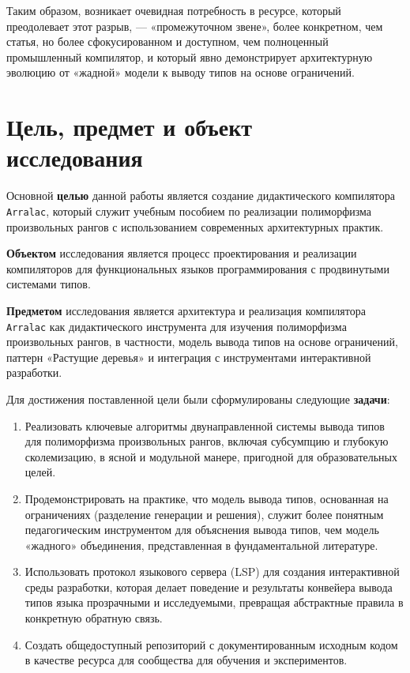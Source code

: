 Таким образом, возникает очевидная потребность в ресурсе, который преодолевает этот разрыв, — «промежуточном звене», более конкретном, чем статья, но более сфокусированном и доступном, чем полноценный промышленный компилятор, и который явно демонстрирует архитектурную эволюцию от «жадной» модели к выводу типов на основе ограничений.

\chapter{Цель, предмет и объект \\ исследования}
Основной \textbf{целью} данной работы является создание дидактического компилятора \texttt{Arralac}, который служит учебным пособием по реализации полиморфизма произвольных рангов с использованием современных архитектурных практик.

\textbf{Объектом} исследования является процесс проектирования и реализации компиляторов для функциональных языков программирования с продвинутыми системами типов.

\textbf{Предметом} исследования является архитектура и реализация компилятора \texttt{Arralac} как дидактического инструмента для изучения полиморфизма произвольных рангов, в частности, модель вывода типов на основе ограничений, паттерн «Растущие деревья» и интеграция с инструментами интерактивной разработки.

Для достижения поставленной цели были сформулированы следующие \textbf{задачи}:
\begin{enumerate}
    \item Реализовать ключевые алгоритмы двунаправленной системы вывода типов для полиморфизма произвольных рангов, включая субсумпцию и глубокую сколемизацию, в ясной и модульной манере, пригодной для образовательных целей.
    \item Продемонстрировать на практике, что модель вывода типов, основанная на ограничениях (разделение генерации и решения), служит более понятным педагогическим инструментом для объяснения вывода типов, чем модель «жадного» объединения, представленная в фундаментальной литературе.
    \item Использовать протокол языкового сервера (LSP) для создания интерактивной среды разработки, которая делает поведение и результаты конвейера вывода типов языка прозрачными и исследуемыми, превращая абстрактные правила в конкретную обратную связь.
    \item Создать общедоступный репозиторий с документированным исходным кодом \cite{deemp-arbitrary-rank-tutorial} в качестве ресурса для сообщества для обучения и экспериментов.
\end{enumerate}

